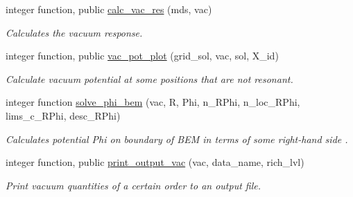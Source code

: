 \begin{DoxyCompactItemize}
integer function, public \hyperlink{namespacevac__ops_a5e5a8322b3aa2e3704b1050426f06d9d}{calc\+\_\+vac\+\_\+res} (mds, vac)
\begin{DoxyCompactList}\small\item\em Calculates the vacuum response. \end{DoxyCompactList}\item 
integer function, public \hyperlink{namespacevac__ops_a3a2a3aed45951aecef42197b82a5a6da}{vac\+\_\+pot\+\_\+plot} (grid\+\_\+sol, vac, sol, X\+\_\+id)
\begin{DoxyCompactList}\small\item\em Calculate vacuum potential at some positions that are not resonant. \end{DoxyCompactList}\item 
integer function \hyperlink{namespacevac__ops_ace79efa50ae5a120e515164c99ce9582}{solve\+\_\+phi\+\_\+bem} (vac, R, Phi, n\+\_\+\+R\+Phi, n\+\_\+loc\+\_\+\+R\+Phi, lims\+\_\+c\+\_\+\+R\+Phi, desc\+\_\+\+R\+Phi)
\begin{DoxyCompactList}\small\item\em Calculates potential {\ttfamily Phi} on boundary of B\+EM in terms of some right-\/hand side . \end{DoxyCompactList}\item 
integer function, public \hyperlink{namespacevac__ops_a78969bf43f80f0df3acf23c47edf7aff}{print\+\_\+output\+\_\+vac} (vac, data\+\_\+name, rich\+\_\+lvl)
\begin{DoxyCompactList}\small\item\em Print vacuum quantities of a certain order to an output file. \end{DoxyCompactList}\end{DoxyCompactItemize}
